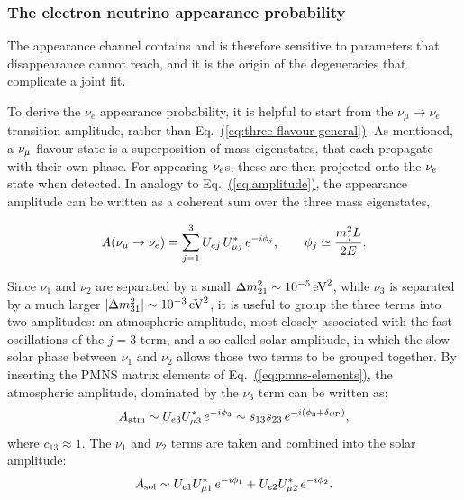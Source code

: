 \subsubsection*{The electron neutrino appearance probability}
The appearance channel contains and is therefore sensitive to parameters that disappearance cannot reach, and it is the origin of the degeneracies that complicate a joint fit.

To derive the $\nu_e$ appearance probability, it is helpful to start from the $\nu_\mu \rightarrow \nu_e$ transition amplitude, rather than Eq.~\hyperref[eq:three-flavour-general]{(\ref{eq:three-flavour-general})}.
As mentioned, a $\nu_\mu$ flavour state is a superposition of mass eigenstates, that each propagate with their own phase. For appearing $\nu_e$s, these are then projected onto the $\nu_e$ state when detected.
In analogy to Eq.~\hyperref[eq:amplitude]{(\ref{eq:amplitude})}, the appearance amplitude can be written as a coherent sum over the three mass eigenstates,

\begin{equation}
    A(\nu_\mu \to \nu_e)
    = \sum_{j=1}^{3} U_{e j}\,U_{\mu j}^{*}\,e^{-i\phi_j},
    \qquad
    \phi_j \simeq \frac{m_j^{2}L}{2E}.
    \label{eq:pmue-amplitude-sum}
\end{equation}

Since $\nu_1$ and $\nu_2$ are separated by a small $\Delta m^{2}_{21}\sim 10^{-5}\,\mathrm{eV}^{2}$, while $\nu_3$ is separated by a much larger $|\Delta m^{2}_{31}|\sim 10^{-3}\,\mathrm{eV}^{2}$, it is useful to group the three terms into two amplitudes: an atmospheric amplitude, most closely associated with the fast oscillations of the $j=3$ term, and a so-called solar amplitude, in which the slow solar phase between $\nu_1$ and $\nu_2$ allows those two terms to be grouped together.              
By inserting the PMNS matrix elements of Eq.~\hyperref[eq:pmns-elements]{(\ref{eq:pmns-elements})}, the atmospheric amplitude, dominated by the $\nu_3$ term can be written as:
\begin{equation}
    A_{\rm atm} \sim U_{e3}U_{\mu 3}^{*}\,e^{-i\phi_3}
    \sim s_{13}s_{23}\,e^{-i(\phi_3+\delta_{\rm CP})},
    \label{eq:atm-amplitude}
\end{equation}
where $c_{13} \approx 1$.
The $\nu_1$ and $\nu_2$ terms are taken and combined into the solar amplitude:
\begin{equation}
    A_{\rm sol} \sim U_{e1}U_{\mu 1}^{*}\,e^{-i\phi_1} + U_{e2}U_{\mu 2}^{*}\,e^{-i\phi_2}.
    \label{eq:sol-amplitude}
\end{equation}

